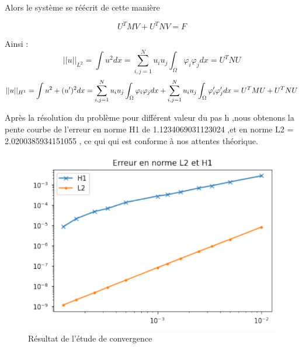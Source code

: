 \documentclass[12pt]{article}
\begin{document}
Alors le système se réécrit de cette manière

$$
U^{T}MV + U^{T}NV = F
$$

Ainsi :
$$
|| u||_{L^{2}} = \int  u^2 dx = \sum_{i,j = 1}^{N} u_i u_j\int_{\Omega} \varphi_i\varphi_j dx = U^{T}NU 
$$
$$
|| u||_{H^{1}} = \int  u^2 + (u')^2 dx \\
= \sum_{i,j = 1}^{N} u_i u_j\int_{\Omega} \varphi_i\varphi_j dx + 
\sum_{i,j = 1}^{N} u_i u_j\int_{\Omega} \varphi_i'\varphi_j'dx \\
= U^{T}MU + U^{T}NU
$$


Après la résolution du problème pour différent valeur du pas h ,nous obtenons la pente courbe de l'erreur en norme H1 de 
1.1234069031123024 ,et en norme  L2 =  2.0200385934151055 , ce qui qui est conforme à nos attentes théorique.


\newpage


\begin{figure}
\begin{center}
\includegraphics[scale=1]{erreurL2H1.pdf}
\caption[]{Résultat de l'étude de convergence }
\end{center}
\end{figure}
\end{document}
